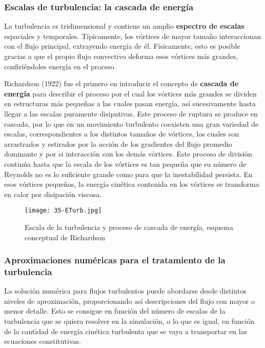 \subsubsection{Escalas de turbulencia: la cascada de
energía}\label{header-n461}

La turbulencia es tridimensional y contiene un amplio \textbf{espectro
de escalas} espaciales y temporales. Típicamente, los vórtices de mayor
tamaño interaccionan con el flujo principal, extrayendo energía de él.
Físicamente, esto es posible gracias a que el propio flujo convectivo
deforma esos vórtices más grandes, confiriéndoles energía en el proceso.

Richardson (1922) fue el primero en introducir el concepto de
\textbf{cascada de energía} para describir el proceso por el cual los
vórtices más grandes se dividen en estructuras más pequeñas a las cuales
pasan energía, así sucesivamente hasta llegar a las escalas puramente
disipativas. Este proceso de ruptura se produce en cascada, por lo que
en un movimiento turbulento coexisten una gran variedad de escalas,
correspondientes a los distintos tamaños de vórtices, los cuales son
arrastrados y estirados por la acción de los gradientes del flujo
promedio dominante y por si interacción con los demás vórtices. Este
proceso de división continúa hasta que la escala de los vórtices es tan
pequeña que su número de Reynolds no es lo suficiente grande como para
que la inestabilidad persista. En esos vórtices pequeños, la energía
cinética contenida en los vórtices se transforma en calor por disipación
viscosa.

\begin{figure}
\centering
\texttt{[image: 35-ETurb.jpg]}
\caption[Escala de la turbulencia]{Escala de la turbulencia y proceso de cascada de energía, esquema conceptual de Richardson}
\label{fig:ETurb}
\end{figure}

\subsubsection{Aproximaciones numéricas para el tratamiento de la
turbulencia}\label{header-n472}

La solución numérica para flujos turbulentos puede abordarse desde
distintos niveles de aproximación, proporcionando así descripciones del
flujo con mayor o menor detalle. Esto se consigue en función del número
de escalas de la turbulencia que se quiera resolver en la simulación, o
lo que es igual, en función de la cantidad de energía cinética
turbulenta que se vaya a transportar en las ecuaciones constitutivas.

